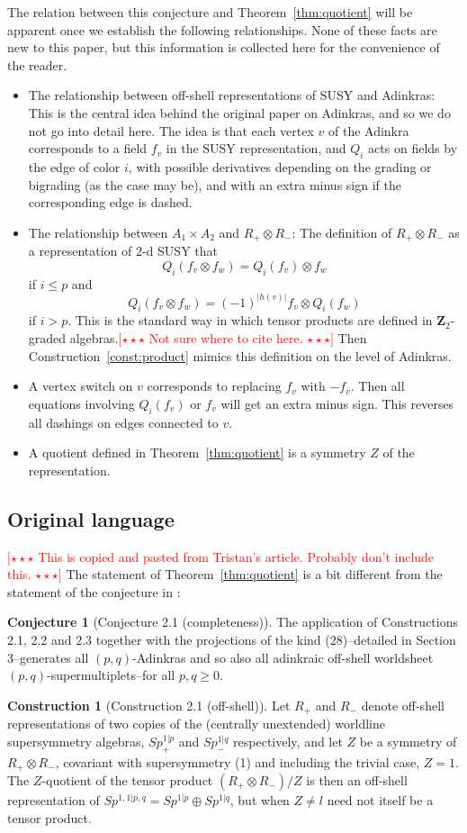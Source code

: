 \documentclass[12pt,twoside,singlespace]{article}
\numberwithin{equation}{section}
\theoremstyle{definition}
\newtheorem{construction}[equation]{Construction}
\newtheorem{conjecture}[equation]{Conjecture}
\newcommand{\ZZ}{\mathbf{Z}}
\newcommand{\com}[1]{\textcolor{red}{$[\star \star \star$ #1 $\star \star \star]$}}
\begin{document}
The relation between this conjecture and Theorem~\ref{thm:quotient} will be apparent once we establish the following relationships.  None of these facts are new to this paper, but this information is collected here for the convenience of the reader.
\begin{itemize}
\item The relationship between off-shell representations of SUSY and Adinkras: This is the central idea behind the original paper on Adinkras\cite{d2l:first}, and so we do not go into detail here.  The idea is that each vertex $v$ of the Adinkra corresponds to a field $f_v$ in the SUSY representation, and $Q_i$ acts on fields by the edge of color $i$, with possible derivatives depending on the grading or bigrading (as the case may be), and with an extra minus sign if the corresponding edge is dashed.
\item The relationship between $A_1\times A_2$ and $R_+\otimes R_-$: The definition of $R_+\otimes R_-$ as a representation of $2$-d SUSY that
\[Q_i(f_v\otimes f_w)=Q_i(f_v)\otimes f_w \]
if $i\le p$ and
\[Q_i(f_v\otimes f_w)=(-1)^{|h(v)|}f_v\otimes Q_i(f_w)\]
if $i >p$.  This is the standard way in which tensor products are defined in $\ZZ_2$-graded algebras.\cite{?}\com{Not sure where to cite here.}  Then Construction~\ref{const:product} mimics this definition on the level of Adinkras.
\item A vertex switch on $v$ corresponds to replacing $f_v$ with $-f_v$.  Then all equations involving $Q_i(f_v)$ or $f_v$ will get an extra minus sign.  This reverses all dashings on edges connected to $v$.
\item A quotient defined in Theorem~\ref{thm:quotient} is a symmetry $Z$ of the representation.
\end{itemize}

\subsection{Original language}
\com{This is copied and pasted from Tristan's article.  Probably don't include this.}
The statement of Theorem~\ref{thm:quotient} is a bit different from the statement of the conjecture in \cite{hubsch:weaving}:

\begin{conjecture}[Conjecture 2.1 (completeness)] The application of Constructions 2.1, 2.2 and 2.3 together with the projections of the kind (28)--detailed in Section 3--generates all $(p,q)$-Adinkras and so also all adinkraic off-shell worldsheet $(p, q)$-supermultiplets--for all $p, q \ge 0$.
\end{conjecture}
\begin{construction}[Construction 2.1 (off-shell)] Let $R_+$ and $R_-$ denote off-shell representations of two copies of the
(centrally unextended) worldline supersymmetry algebras, $Sp_+^{1|p}$ and $Sp_-^{1|q}$ respectively, and let $Z$ be a symmetry of $R_+ \otimes R_-$, covariant with supersymmetry (1) and including the trivial case, $Z = 1$. The $Z$-quotient of the tensor product $(R_+ \otimes R_-)/Z$ is then an off-shell representation of $Sp^{1,1|p,q} = Sp^{1|p}\oplus Sp^{1|q}$, but when $Z\not= l$ need not itself be a tensor product.
\end{construction}
\end{document}
